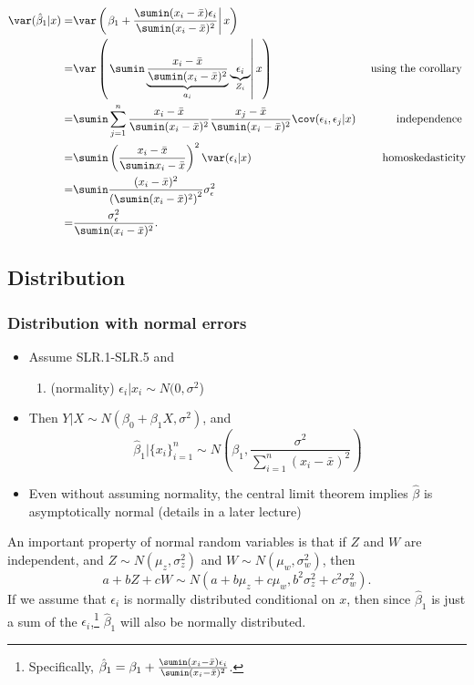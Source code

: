\begin{align*}
  \var(\hat{\beta}_1|x) = & \var\left(\left. \beta_1 + \frac{\sumin (x_i - \bar{x})
        \epsilon_i}{\sumin (x_i - \bar{x})^2} \right\vert x \right)  \\
  = & \var\left(\left. \sumin \underbrace{\frac{x_i - \bar{x}}{\sumin (x_i -
          \bar{x})^2}}_{a_i} \underbrace{\epsilon_i}_{Z_i} \right\vert x
  \right)
  & \text{ using the corollary } \\
  = & \sumin \sum_{j=1}^n \frac{x_i - \bar{x}}{\sumin (x_i -
    \bar{x})^2} \frac{x_j - \bar{x}}{\sumin (x_i -
    \bar{x})^2} \cov(\epsilon_i, \epsilon_j | x)
  & \text{ independence } \\
  = & \sumin \left(\frac{x_i - \bar{x}}{\sumin x_i - \bar{x}}
  \right)^2 \var(\epsilon_i | x) 
  & \text{ homoskedasticity} \\
  = & \sumin \frac{(x_i - \bar{x})^2}{\left( \sumin (x_i - \bar{x})^2
    \right)^2} \sigma_\epsilon^2 \\
  = & \frac{\sigma_\epsilon^2}{\sumin (x_i - \bar{x})^2}.
\end{align*}

\subsection{Distribution}
\begin{frame}
  \frametitle{Distribution with normal errors}
  \begin{itemize}
  \item Assume SLR.1-SLR.5 and
    \begin{enumerate}
    \item[SLR.6] (normality) $\epsilon_i|x_i \sim N(0,\sigma^2$)
    \end{enumerate}
  \item Then $Y|X \sim N(\beta_0 + \beta_1 X, \sigma^2)$, and
    \[ \hat{\beta}_1|\{x_i\}_{i=1}^n \sim N\left(\beta_1, \frac{\sigma^2}{\sum_{i=1}^n
        (x_i - \bar{x})^2} \right) \]
  \item Even without assuming normality, the central limit theorem
    implies $\hat{\beta}$ is asymptotically normal (details in a later
    lecture)
  \end{itemize}
\end{frame}

An important property of normal random variables is that if $Z$ and
$W$ are independent, and $Z \sim N(\mu_z, \sigma_z^2)$ and $W \sim
N(\mu_w, \sigma_w^2)$, then 
\[ a + bZ + cW \sim N(a + b \mu_z + c \mu_w, b^2 \sigma^2_z + c^2
\sigma^2_w). \] If we assume that $\epsilon_i$ is normally distributed
conditional on $x$, then since $\hat{\beta}_1$ is just a sum of the
$\epsilon_i$,\footnote{Specifically, $ \hat{\beta}_1 = \beta_1 +
  \frac{\sumin (x_i - \bar{x}) \epsilon_i}{\sumin (x_i -
    \bar{x})^2}$.}
$\hat{\beta}_1$ will also be normally distributed. 

